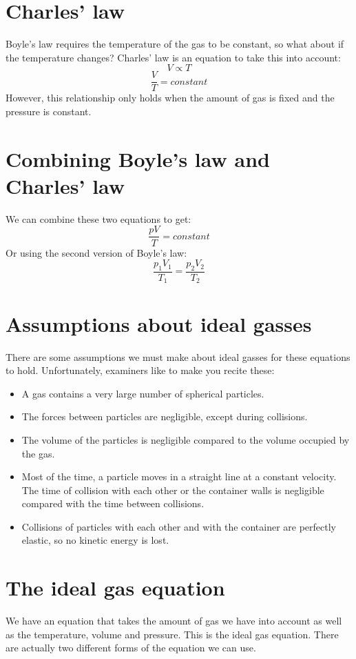\documentclass{article}
\begin{document}
\section*{Charles' law}
Boyle's law requires the temperature of the gas to be constant, so what about if
the temperature changes? Charles' law is an equation to take this into account:
\[
	V \propto T
\]
\[
	\frac{V}{T} = constant
\]
However, this relationship only holds when the amount of gas is fixed and the
pressure is constant.

\section*{Combining Boyle's law and Charles' law}
We can combine these two equations to get:
\[
	\frac{pV}{T} = constant
\]
Or using the second version of Boyle's law:
\[
	\frac{p_1V_1}{T_1} = \frac{p_2V_2}{T_2}
\]

\section*{Assumptions about ideal gasses}
There are some assumptions we must make about ideal gasses for these equations
to hold. Unfortunately, examiners like to make you recite these:

\begin{itemize}
	\item A gas contains a very large number of spherical particles.
	\item The forces between particles are negligible, except during collisions.
	\item The volume of the particles is negligible compared to the volume
	occupied by the gas.
	\item Most of the time, a particle moves in a straight line at a constant
	velocity. The time of collision with each other or the container walls is
	negligible compared with the time between collisions.
	\item Collisions of particles with each other and with the container are
	perfectly elastic, so no kinetic energy is lost.
\end{itemize}

\section*{The ideal gas equation}
We have an equation that takes the amount of gas we have into account as well
as the temperature, volume and pressure. This is the ideal gas equation. There
are actually two different forms of the equation we can use.
\end{document}
